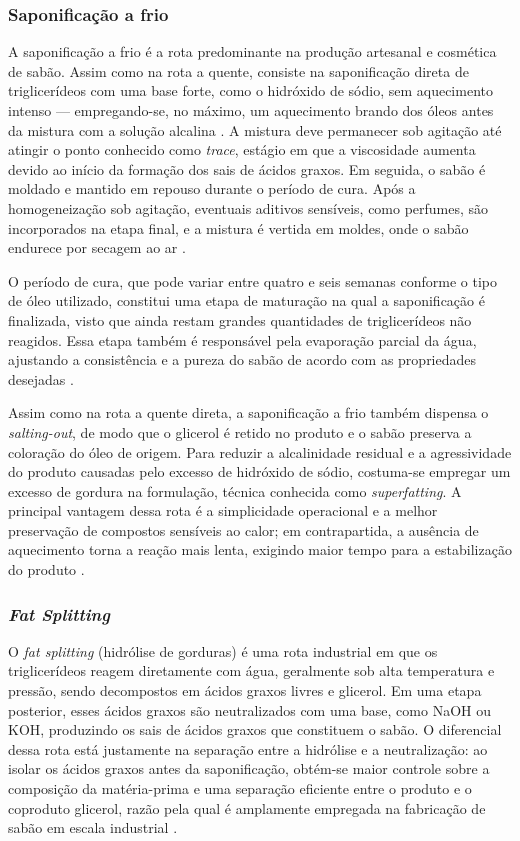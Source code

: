 \subsubsection{Saponificação a frio}

A saponificação a frio é a rota predominante na produção artesanal e cosmética de sabão. Assim como na rota a quente, consiste na saponificação direta de triglicerídeos com uma base forte, como o hidróxido de sódio, sem aquecimento intenso — empregando-se, no máximo, um aquecimento brando dos óleos antes da mistura com a solução alcalina \cite{warra2010cold}. A mistura deve permanecer sob agitação até atingir o ponto conhecido como \textit{trace}, estágio em que a viscosidade aumenta devido ao início da formação dos sais de ácidos graxos. Em seguida, o sabão é moldado e mantido em repouso durante o período de cura. Após a homogeneização sob agitação, eventuais aditivos sensíveis, como perfumes, são incorporados na etapa final, e a mistura é vertida em moldes, onde o sabão endurece por secagem ao ar \cite{warra2010cold}. 

O período de cura, que pode variar entre quatro e seis semanas conforme o tipo de óleo utilizado, constitui uma etapa de maturação na qual a saponificação é finalizada, visto que ainda restam grandes quantidades de triglicerídeos não reagidos. Essa etapa também é responsável pela evaporação parcial da água, ajustando a consistência e a pureza do sabão de acordo com as propriedades desejadas \cite{alum2024saponification}. 

Assim como na rota a quente direta, a saponificação a frio também dispensa o \textit{salting-out}, de modo que o glicerol é retido no produto e o sabão preserva a coloração do óleo de origem. Para reduzir a alcalinidade residual e a agressividade do produto causadas pelo excesso de hidróxido de sódio, costuma-se empregar um excesso de gordura na formulação, técnica conhecida como \textit{superfatting}. A principal vantagem dessa rota é a simplicidade operacional e a melhor preservação de compostos sensíveis ao calor; em contrapartida, a ausência de aquecimento torna a reação mais lenta, exigindo maior tempo para a estabilização do produto \cite{alum2024saponification}.

\subsubsection{\textit{Fat Splitting}}

O \textit{fat splitting} (hidrólise de gorduras) é uma rota industrial em que os triglicerídeos reagem diretamente com água, geralmente sob alta temperatura e pressão, sendo decompostos em ácidos graxos livres e glicerol. Em uma etapa posterior, esses ácidos graxos são neutralizados com uma base, como NaOH ou KOH, produzindo os sais de ácidos graxos que constituem o sabão. O diferencial dessa rota está justamente na separação entre a hidrólise e a neutralização: ao isolar os ácidos graxos antes da saponificação, obtém-se maior controle sobre a composição da matéria-prima e uma separação eficiente entre o produto e o coproduto glicerol, razão pela qual é amplamente empregada na fabricação de sabão em escala industrial \cite{sonntag1979fat}.

